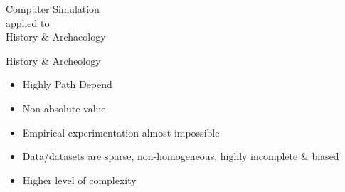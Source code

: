 \documentclass[12pt, notes=show]{beamer}
\begin{document}
%

\begin{frame}
    \begin{center}
	\Huge
	Computer Simulation \\ applied to\\  History \& Archaeology
    \end{center}
\end{frame}


\begin{frame}{History \& Archeology}

    \begin{itemize}
	\item <3-> Highly Path Depend
	\item <4-> Non absolute value
	\item<5-> Empirical experimentation almost impossible
	\item <6-> Data/datasets are sparse, non-homogeneous, highly incomplete \& biased
    \end{itemize}
    
    \begin{itemize}
	\item<8-> Higher level of complexity
    \end{itemize}
\end{frame}

\end{document}
